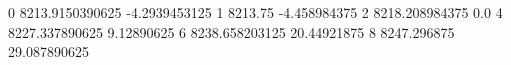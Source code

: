 0 8213.9150390625 -4.2939453125
1 8213.75 -4.458984375
2 8218.208984375 0.0
4 8227.337890625 9.12890625
6 8238.658203125 20.44921875
8 8247.296875 29.087890625
